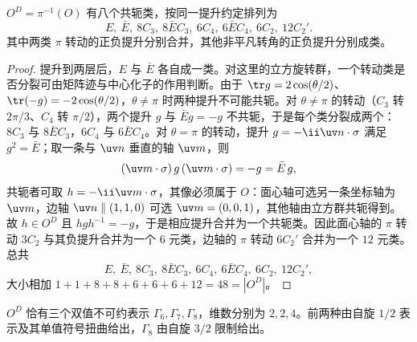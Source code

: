 \begin{proposition}[立方双群的共轭类]
$O^D=\pi^{-1}(O)$ 有八个共轭类，按同一提升约定排列为
\[
E,\ \bar E,\ 8C_3,\ 8\bar EC_3,\ 6C_4,\ 6\bar EC_4,\ 6C_2,\ 12C_2'.
\]
其中两类 $\pi$ 转动的正负提升分别合并，其他非平凡转角的正负提升分别成类。
\end{proposition}
\begin{proof}
提升到两层后，$E$ 与 $\bar E$ 各自成一类。对这里的立方旋转群，一个转动类是否分裂可由矩阵迹与中心化子的作用判断。由于 $\tr g=2\cos(\theta/2)$、$\tr(-g)=-2\cos(\theta/2)$，$\theta\ne\pi$ 时两种提升不可能共轭。对 $\theta\neq\pi$ 的转动（$C_3$ 转 $2\pi/3$、$C_4$ 转 $\pi/2$），两个提升 $g$ 与 $\bar Eg=-g$ 不共轭，于是每个类分裂成两个：$8C_3$ 与 $8\bar EC_3$，$6C_4$ 与 $6\bar EC_4$。对 $\theta=\pi$ 的转动，提升 $g=-\ii\uv n\cdot\sigma$ 满足 $g^2=\bar E$；取一条与 $\uv n$ 垂直的轴 $\uv m$，则
\[
(\uv m\cdot\sigma)\,g\,(\uv m\cdot\sigma)=-g=\bar E\,g,
\]
共轭者可取 $h=-\ii\uv m\cdot\sigma$，其像必须属于 $O$：面心轴可选另一条坐标轴为 $\uv m$，边轴 $\uv n\parallel(1,1,0)$ 可选 $\uv m=(0,0,1)$，其他轴由立方群共轭得到。故 $h\in O^D$ 且 $hgh^{-1}=-g$，于是相应提升合并为一个共轭类。因此面心轴的 $\pi$ 转动 $3C_2$ 与其负提升合并为一个 $6$ 元类，边轴的 $\pi$ 转动 $6C_2'$ 合并为一个 $12$ 元类。总共
\[
E,\ \bar E,\ 8C_3,\ 8\bar EC_3,\ 6C_4,\ 6\bar EC_4,\ 6C_2,\ 12C_2',
\]
大小相加 $1+1+8+8+6+6+6+12=48=|O^D|$。
\end{proof}
\begin{proposition}[立方双群的双值不可约表示]
$O^D$ 恰有三个双值不可约表示 $\Gamma_6,\Gamma_7,\Gamma_8$，维数分别为 $2,2,4$。前两种由自旋 $1/2$ 表示及其单值符号扭曲给出，$\Gamma_8$ 由自旋 $3/2$ 限制给出。
\end{proposition}

